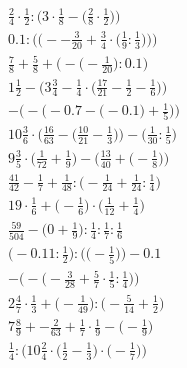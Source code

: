 \documentclass[8pt]{article}
\begin{document}
\begin{align}
\frac{2}{4} \cdot \frac{1}{2} : \Big(3 \cdot \frac{1}{8} - \big(\frac{2}{8} \cdot \frac{1}{2}\big)\Big) \\
0.1 : \bigg(\Big(--\frac{3}{20} + \frac{3}{4} \cdot \big(\frac{1}{9} : \frac{1}{3}\big)\Big)\bigg) \\
\frac{7}{8} + \frac{5}{8} + \Big(-\big(-\frac{1}{20}\big) : 0.1\Big) \\
1\frac{1}{2} - \Big(3\frac{3}{4} - \frac{1}{4} \cdot \big(\frac{17}{21} - \frac{1}{2} - \frac{1}{6}\big)\Big) \\
-\bigg(-\Big(-0.7 - \big(-0.1\big) + \frac{1}{5}\Big)\bigg) \\
10\frac{3}{6} \cdot \Big(\frac{16}{63} - \big(\frac{10}{21} - \frac{1}{3}\big)\Big) - \Big(\frac{1}{30} : \frac{1}{5}\Big) \\
9\frac{3}{5} \cdot \Big(\frac{1}{72} + \frac{1}{9}\Big) - \Big(\frac{13}{40} + \big(-\frac{1}{8}\big)\Big) \\
\frac{41}{42} - \frac{1}{7} + \frac{1}{48} : \big(-\frac{1}{24} + \frac{1}{24} : \frac{1}{4}\big) \\
19 \cdot \frac{1}{6} + \big(-\frac{1}{6}\big) \cdot \big(\frac{1}{12} + \frac{1}{4}\big) \\
\frac{59}{504} - \big(0 + \frac{1}{9}\big) : \frac{1}{4} : \frac{1}{7} : \frac{1}{6} \\
\Big(-0.11 : \frac{1}{2}\Big) : \Big(\big(-\frac{1}{5}\big)\Big) - 0.1 \\
-\Big(-\big(-\frac{3}{28} + \frac{5}{7} \cdot \frac{1}{5} : \frac{1}{4}\big)\Big) \\
2\frac{4}{7} \cdot \frac{1}{3} + \big(-\frac{1}{49}\big) : \big(-\frac{5}{14} + \frac{1}{2}\big) \\
7\frac{8}{9} + -\frac{2}{63} + \frac{1}{7} \cdot \frac{1}{9} - \big(-\frac{1}{9}\big) \\
\frac{1}{4} : \Big(10\frac{2}{4} \cdot \big(\frac{1}{2} - \frac{1}{3}\big) \cdot \big(-\frac{1}{7}\big)\Big)
\end{align}
\end{document}

